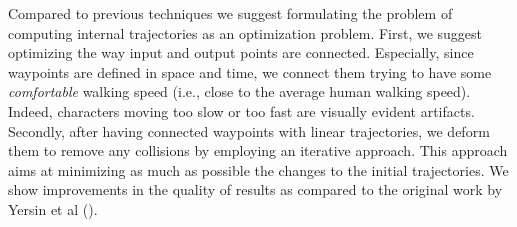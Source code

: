 Compared to previous techniques we suggest formulating the problem of computing internal trajectories as an optimization problem.
First, we suggest optimizing the way input and output points are connected.
Especially, since waypoints are defined in space and time, we connect them trying to have some {\it comfortable} walking speed (i.e., close to the average human walking speed).
Indeed, characters moving too slow or too fast are visually evident artifacts.
Secondly, after having connected waypoints with linear trajectories, we deform them to remove any collisions by employing an iterative approach.
This approach aims at minimizing as much as possible the changes to the initial trajectories.
We show improvements in the quality of results as compared to the original work by Yersin et al ().


